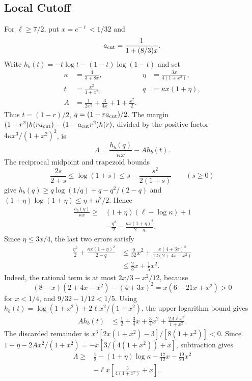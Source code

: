 \subsection{Local Cutoff}
\label{app:manual-local}\label{app:analytic-local}

For \(\ell\ge7/2\), put \(x=e^{-\ell}<1/32\) and
\begin{equation}
                 a_{\rm cut}=\frac{1}{1+(8/3)x}.
 \label{eq:rational-local-cutoff}
\end{equation}
Write \(h_b(t)=-t\log t-(1-t)\log(1-t)\) and set
\begin{align*}
 \kappa&=\frac4{3+8x},& \eta&=\frac{3x}{4(1+x^2)},\\
 t&=\frac{x^2}{1+x^2},& q&=\kappa x(1+\eta),\\
 A&=\frac1{2x^2}+\frac3{4x}+1+\frac{x^2}{2}.
\end{align*}
Thus \(t=(1-r)/2\), \(q=(1-r a_{\rm cut})/2\). The margin
\((1-r^2)h(r a_{\rm cut})-(1-a_{\rm cut}r^2)h(r)\), divided by the positive factor
\(4\kappa x^3/(1+x^2)^2\), is
\[
 \Lambda=\frac{h_b(q)}{\kappa x}-Ah_b(t).
\]
The reciprocal midpoint and trapezoid bounds
\[
 \frac{2s}{2+s}\le\log(1+s)\le s-\frac{s^2}{2(1+s)}
 \qquad(s\ge0)
\]
give \(h_b(q)\ge q\log(1/q)+q-q^2/(2-q)\) and
\((1+\eta)\log(1+\eta)\le\eta+\eta^2/2\). Hence
\begin{align*}
 \frac{h_b(q)}{\kappa x}\ge{}&
 (1+\eta)(\ell-\log\kappa)+1\\
 &-\frac{\eta^2}{2}-\frac{\kappa x(1+\eta)^2}{2-q}.
\end{align*}
Since \(\eta\le3x/4\), the last two errors satisfy
\begin{align*}
 \frac{\eta^2}{2}+\frac{\kappa x(1+\eta)^2}{2-q}
 &\le\frac9{32}x^2+\frac{x(4+3x)^2}{12(2+4x-x^2)}\\
 &\le\frac23x+\frac15x^2.
\end{align*}
Indeed, the rational term is at most \(2x/3-x^2/12\), because
\[
 (8-x)(2+4x-x^2)-(4+3x)^2=x(6-21x+x^2)>0
\]
for \(x<1/4\), and \(9/32-1/12<1/5\).
Using \(h_b(t)=\log(1+x^2)+2\ell x^2/(1+x^2)\), the upper
logarithm bound gives
\begin{align*}
 Ah_b(t)&\le\frac12+\frac34x+\frac34x^2
                 +\frac{2A\ell x^2}{1+x^2}.
\end{align*}
The discarded remainder is
\(x^3[2x(1+x^2)-3]/[8(1+x^2)]<0\).
Since \(1+\eta-2Ax^2/(1+x^2)=-x[3/(4(1+x^2))+x]\), subtraction gives
\begin{equation}
 \begin{split}
 \Lambda\ge{}&\frac12-(1+\eta)\log\kappa
 -\frac{17}{12}x-\frac{19}{20}x^2\\
 &-\ell x\left[\frac{3}{4(1+x^2)}+x\right].
 \end{split}
 \label{eq:manual-local-cancellation}
\end{equation}


